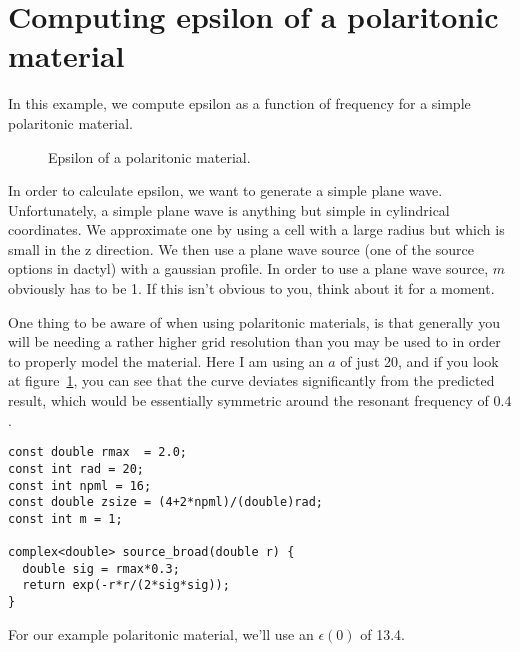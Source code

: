 \begin{comment}
#include <stdio.h>
#include <stdlib.h>
#include <signal.h>

#include "dactyl.h"
\end{comment}

\section{Computing epsilon of a polaritonic material}

In this example, we compute epsilon as a function of frequency for a simple
polaritonic material.

\begin{figure}
\label{epsilon_polariton}
\caption{Epsilon of a polaritonic material.}
\end{figure}

In order to calculate epsilon, we want to generate a simple plane wave.
Unfortunately, a simple plane wave is anything but simple in cylindrical
coordinates.  We approximate one by using a cell with a large radius but
which is small in the z direction.  We then use a plane wave source (one of
the source options in dactyl) with a gaussian profile.  In order to use a
plane wave source, $m$ obviously has to be 1.  If this isn't obvious to
you, think about it for a moment.

One thing to be aware of when using polaritonic materials, is that
generally you will be needing a rather higher grid resolution than you may
be used to in order to properly model the material.  Here I am using an $a$
of just 20, and if you look at figure~\ref{epsilon_polariton}, you can see
that the curve deviates significantly from the predicted result, which
would be essentially symmetric around the resonant frequency of $0.4$.

\begin{verbatim}
const double rmax  = 2.0;
const int rad = 20;
const int npml = 16;
const double zsize = (4+2*npml)/(double)rad;
const int m = 1;

complex<double> source_broad(double r) {
  double sig = rmax*0.3;
  return exp(-r*r/(2*sig*sig));
}
\end{verbatim}

For our example polaritonic material, we'll use an $\epsilon(0)$ of 13.4.

